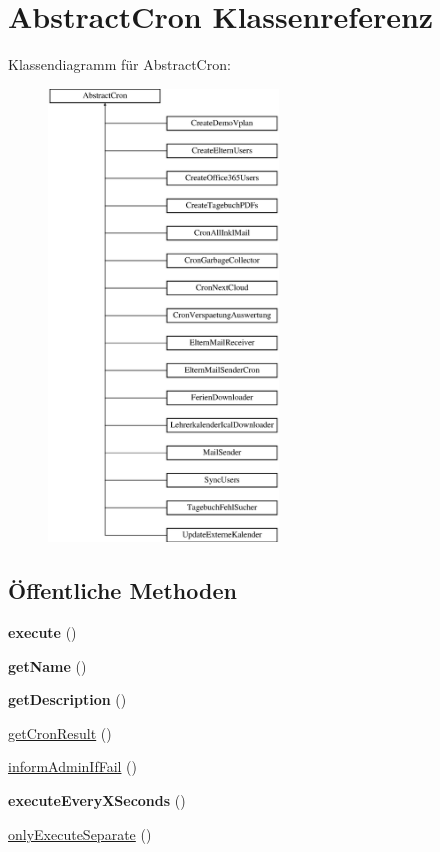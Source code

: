 \hypertarget{class_abstract_cron}{}\section{Abstract\+Cron Klassenreferenz}
\label{class_abstract_cron}
Klassendiagramm für Abstract\+Cron\+:\begin{figure}[H]
\begin{center}
\leavevmode
\includegraphics[height=12.000000cm]{class_abstract_cron}
\end{center}
\end{figure}
\subsection*{Öffentliche Methoden}
\begin{DoxyCompactItemize}
\item 
\mbox{\label{class_abstract_cron_a9bfe042ff6db377dc6e05bb217cac8b6}} 
{\bfseries execute} ()
\item 
\mbox{\label{class_abstract_cron_aeb0aedf029fa60a8bae79c66d1f17f56}} 
{\bfseries get\+Name} ()
\item 
\mbox{\label{class_abstract_cron_adfd40100017105bf56f64d7308d822ba}} 
{\bfseries get\+Description} ()
\item 
\mbox{\hyperlink{class_abstract_cron_abf70f559a58a6ceeb823b81b51fbbfe1}{get\+Cron\+Result}} ()
\item 
\mbox{\hyperlink{class_abstract_cron_a2fcdc1fa0cf8a5f8c214371a96534d17}{inform\+Admin\+If\+Fail}} ()
\item 
\mbox{\label{class_abstract_cron_ac483d93176b2175ba20b528b126c1428}} 
{\bfseries execute\+Every\+X\+Seconds} ()
\item 
\mbox{\hyperlink{class_abstract_cron_a002e8742222233f71416c6d180bc42e9}{only\+Execute\+Separate}} ()
\end{DoxyCompactItemize}



